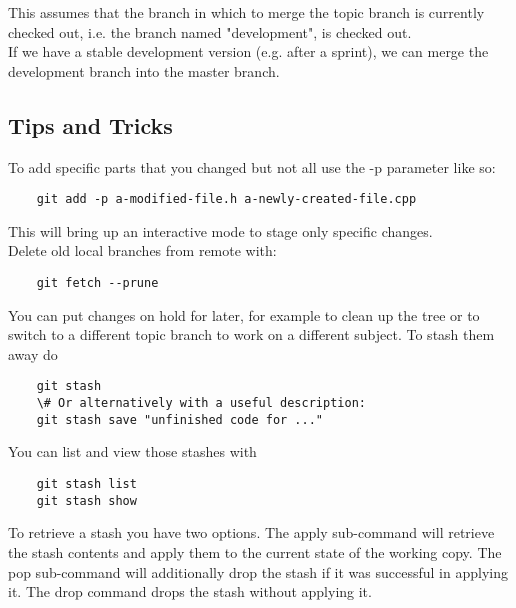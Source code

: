 \documentclass[twoside,12pt,a4paper]{article}
\begin{document}
This assumes that the branch in which to merge the topic branch is currently checked out, i.e. the branch named "development", is checked out. \\
%
If we have a stable development version (e.g. after a sprint), we can merge the development branch into the master branch.


\subsection{Tips and Tricks}
\label{sub:tips_and_tricks}

To add specific parts that you changed but not all use the -p parameter like so:

\begin{lstlisting}
	git add -p a-modified-file.h a-newly-created-file.cpp
\end{lstlisting}

This will bring up an interactive mode to stage only specific changes. \\

Delete old local branches from remote with:

\begin{lstlisting}
	git fetch --prune
\end{lstlisting} 
\vspace*{0.5cm}

You can put changes on hold for later, for example to clean up the tree or to switch to a different topic branch to work on a different subject. To stash them away do

\begin{lstlisting}
	git stash
	\# Or alternatively with a useful description:
	git stash save "unfinished code for ..."
\end{lstlisting}
\vspace*{0.25cm}

You can list and view those stashes with

\begin{lstlisting}
	git stash list
	git stash show
\end{lstlisting}
\vspace*{0.25cm}

To retrieve a stash you have two options. The apply sub-command will retrieve the stash contents and apply them to the current state of the working copy. The pop sub-command will additionally drop the stash if it was successful in applying it. The drop command drops the stash without applying it.
\end{document}
